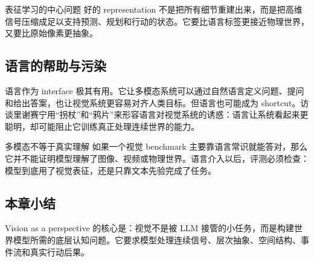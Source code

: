 \begin{importantbox}{表征学习的中心问题}
好的 representation 不是把所有细节重建出来，而是把高维信号压缩成足以支持预测、规划和行动的状态。它要比语言标签更接近物理世界，又要比原始像素更抽象。
\end{importantbox}

\subsection{语言的帮助与污染}

语言作为 interface 极其有用。它让多模态系统可以通过自然语言定义问题、提问和给出答案，也让视觉系统更容易对齐人类目标。但语言也可能成为 shortcut。访谈里谢赛宁用“拐杖”和“鸦片”来形容语言对视觉系统的诱惑：语言让系统看起来更聪明，却可能阻止它训练真正处理连续世界的能力。

\begin{warningbox}{多模态不等于真实理解}
如果一个视觉 benchmark 主要靠语言常识就能答对，那么它并不能证明模型理解了图像、视频或物理世界。语言介入以后，评测必须检查：模型到底用了视觉表征，还是只靠文本先验完成了任务。
\end{warningbox}

\subsection{本章小结}

Vision as a perspective 的核心是：视觉不是被 LLM 接管的小任务，而是构建世界模型所需的底层认知问题。它要求模型处理连续信号、层次抽象、空间结构、事件流和真实行动后果。

